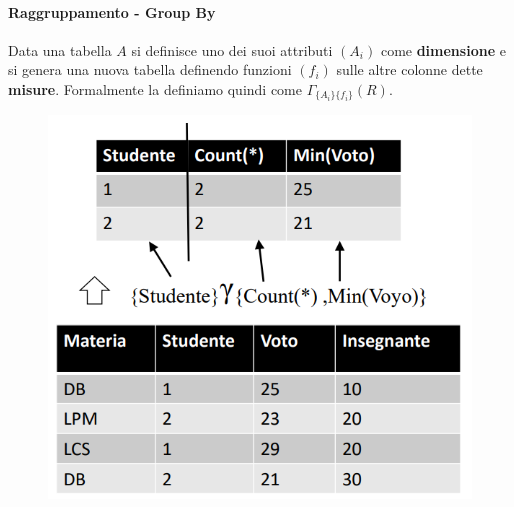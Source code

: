 \documentclass{article}
\begin{document}
\paragraph{Raggruppamento - Group By} Data una tabella $A$ si definisce uno dei suoi attributi $(A_{i})$ come \textbf{dimensione} e si genera una nuova tabella definendo funzioni $(f_{i})$ sulle altre colonne dette \textbf{misure}. Formalmente la definiamo quindi come $\Gamma_{\{A_i\}\{f_i\}}(R)$.

\begin{figure}[htbp]
    \center
    \includegraphics[scale=0.55]{img/groupBy.png}
\end{figure}

\newpage

\end{document}
